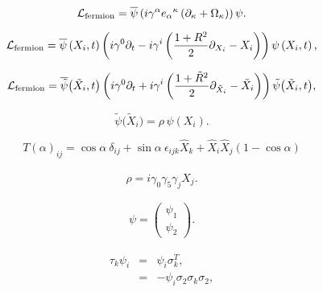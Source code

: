 \documentclass[]{article}
\begin{document}
	
	\begin{equation}
		{\cal L}_{{\rm fermion}} = {\overline \psi} \left( i \gamma^\alpha 
		{e_\alpha}^\kappa \left(
		\partial_\kappa + \Omega_\kappa \right) 
		\right) \psi.
	\end{equation}
	
	\begin{equation}
		\label{L1}
		{\cal L}_{{\rm fermion}} = {\overline \psi} \left(X_i,t \right) 
		\left( i \gamma^0 \partial_t - 
		i \gamma^i \left(\frac{1+R^2}{2} \partial_{X_i} - X_i \right)
		\right)
		\psi \left(X_i,t \right),
	\end{equation}
	
	\begin{equation}
		\label{L2}
		{\cal L}_{{\rm fermion}} = {\overline {\tilde \psi}} \big({\tilde X}_i,t \big) 
		\left( i \gamma^0 \partial_t + 
		i \gamma^i \left(\frac{1+{\tilde R}^2}{2} \partial_{{\tilde X}_i} - 
		{\tilde X}_i \right)
		\right)
		{\tilde \psi} \big({\tilde X}_i,t \big),
	\end{equation}
	
	\begin{equation}
		{\tilde \psi}\big({\tilde X}_i\big) = \rho\, \psi \left( X_i \right).
	\end{equation}
	
	\begin{equation}
		T(\alpha)_{ij} = \cos \alpha~ \delta_{i j} + \sin
		\alpha~\epsilon_{ijk} {\hat X}_k + {\hat X}_i {\hat X}_j (1 - \cos \alpha)
	\end{equation}
	
	\begin{equation}
		\label{rhospin}
		\rho  = i \gamma_0 \gamma_5 \gamma_j {\hat X}_j.
	\end{equation}
	

	
	\begin{eqnarray}
		\psi = 
		\left(
		\begin{array}{c}
			\psi_1 \\
			\psi_2
		\end{array}
		\right).
	\end{eqnarray}
	
	\begin{eqnarray}
		\label{quat1}
		\tau_k \psi_i &=& \psi_i \sigma_k^T, \\
		\label{quat2}
		&=& - \psi_i \sigma_2 \sigma_k \sigma_2,
	\end{eqnarray}
	
\end{document}
